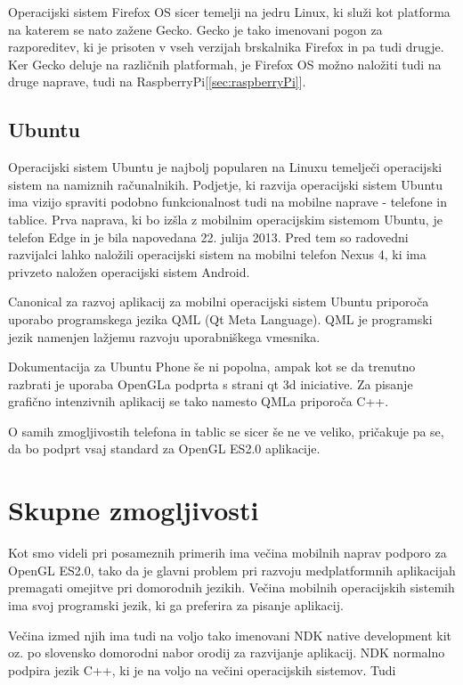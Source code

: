 Operacijski sistem Firefox OS sicer temelji na jedru Linux, ki služi kot platforma na katerem se nato zažene Gecko. Gecko je tako imenovani pogon za razporeditev, ki je prisoten v vseh verzijah brskalnika Firefox in pa tudi drugje. Ker Gecko deluje na različnih platformah, je Firefox OS možno naložiti tudi na druge naprave, tudi na RaspberryPi[\ref{sec:raspberryPi}]. 



\subsection{Ubuntu}

Operacijski sistem Ubuntu je najbolj popularen na Linuxu temelječi operacijski sistem na namiznih računalnikih. Podjetje, ki razvija operacijski sistem Ubuntu ima vizijo spraviti podobno funkcionalnost tudi na mobilne naprave - telefone in tablice. Prva naprava, ki bo izšla z mobilnim operacijskim sistemom Ubuntu, je telefon Edge in je bila napovedana 22. julija 2013. Pred tem so radovedni razvijalci lahko naložili operacijski sistem na mobilni telefon Nexus 4, ki ima privzeto naložen operacijski sistem Android.

Canonical za razvoj aplikacij za mobilni operacijski sistem Ubuntu priporoča uporabo programskega jezika QML (Qt Meta Language). QML je programski jezik namenjen lažjemu razvoju uporabniškega vmesnika. 

Dokumentacija za Ubuntu Phone še ni popolna, ampak kot se da trenutno razbrati je uporaba OpenGLa podprta s strani qt 3d iniciative. Za pisanje grafično intenzivnih aplikacij se tako namesto QMLa priporoča C++.

O samih zmogljivostih telefona in tablic se sicer še ne ve veliko, pričakuje pa se, da bo podprt vsaj standard za OpenGL ES2.0 aplikacije.

\section{Skupne zmogljivosti}

Kot smo videli pri posameznih primerih ima večina mobilnih naprav podporo za OpenGL ES2.0, tako da je glavni problem pri razvoju medplatformnih aplikacijah premagati omejitve pri domorodnih jezikih. Večina mobilnih operacijskih sistemih ima svoj programski jezik, ki ga preferira za pisanje aplikacij.

Večina izmed njih ima tudi na voljo tako imenovani NDK native development kit oz. po slovensko domorodni nabor orodij za razvijanje aplikacij. NDK normalno podpira jezik C++, ki je na voljo na večini operacijskih sistemov. Tudi 




